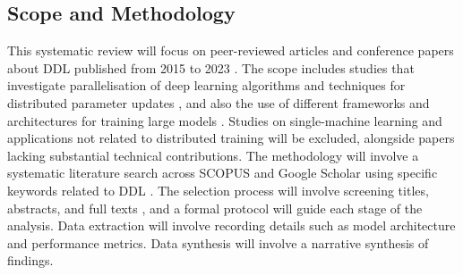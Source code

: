 
\subsection{Scope and Methodology}
This systematic review will focus on peer-reviewed articles and conference papers about DDL published from 2015 to 2023 \cite{berloco_systematic_2022}. The scope includes studies that investigate parallelisation of deep learning algorithms and techniques for distributed parameter updates \cite{berloco_systematic_2022,ben-nun_demystifying_2020,langer_distributed_2020,verbraeken_survey_2021}, and also the use of different frameworks and architectures for training large models \cite{berloco_systematic_2022,langer_distributed_2020}. Studies on single-machine learning and applications not related to distributed training will be excluded, alongside papers lacking substantial technical contributions. The methodology will involve a systematic literature search across SCOPUS and Google Scholar using specific keywords related to DDL \cite{berloco_systematic_2022}. The selection process will involve screening titles, abstracts, and full texts \cite{ben-nun_demystifying_2020}, and a formal protocol will guide each stage of the analysis. Data extraction will involve recording details such as model architecture and performance metrics. Data synthesis will involve a narrative synthesis of findings.


